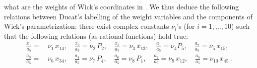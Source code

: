 \documentclass[11pt]{amsart}
\begin{document}
what are the weights of Wick's coordinates in \cite[Table 4.1]{PirioAFST}.  We thus deduce the following relations between Ducat's labelling of the weight variables and the components of Wick's parametrization: there exist complex constants $ \nu_i$'s (for $i=1,\ldots,10$) such that 
the following relations (as rational functions) hold true: 
 \begin{align}
\frac{x_1}{a_5} = & \, \nu_1 \, x_{1 4},\quad 
 \frac{x_2}{a_5} = \nu_2\, P_{2},  \quad 
 \frac{x_ 3}{a_5} = \nu_3 \,x_{1 3}, \quad 
 \frac{a_1}{a_5} = \nu_4 { P}_{5}, \quad 
  \frac{a_2}{a_5} = \nu_5  \, x_{15},\,  
  \nonumber 
 \\ 
  \frac{a_3}{a_5} =& \,   \nu_6 \, x_{34} , \quad  
  \frac{a_4}{a_5} = \nu_7  \,{P}_{4},\quad 
  \frac{a_6}{a_5} = \nu_8 \,
{P}_{1},\quad 
  \frac{a_7}{a_5} = \nu_9 \, x_{12},\quad 
  \frac{a_8}{a_5} = \nu_{10} \, x_{45}\, . 
  \nonumber 
\end{align} 
\end{document}
